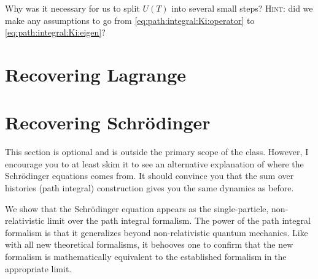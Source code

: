 \documentclass[12pt, oneside]{report}    %
\let\oldsection\section
\def\section{%
  \setcounter{sidenote}{1}%
  \oldsection
}
\begin{document}
\begin{exercise}
Why was it necessary for us to split $U(T)$ into several small steps? \textsc{Hint}: did we make any assumptions to go from \eqref{eq:path:integral:Ki:operator} to \eqref{eq:path:integral:Ki:eigen}? 
\end{exercise}


\section{Recovering Lagrange}




\section{Recovering Schr\"odinger}

This section is optional and is outside the primary scope of the class. However, I encourage you to at least skim it to see an alternative explanation of where the Schr\"odinger equations comes from. It should convince you that the sum over histories (path integral) construction gives you the same dynamics as before. 

We show that the Schr\"odinger equation appears as the single-particle, non-relativistic limit over the path integral formalism. The power of the path integral formalism is that it generalizes beyond non-relativistic quantum mechanics. Like with all new theoretical formalisms, it behooves one to confirm that the new formalism is mathematically equivalent to the established formalism in the appropriate limit.
\end{document}
